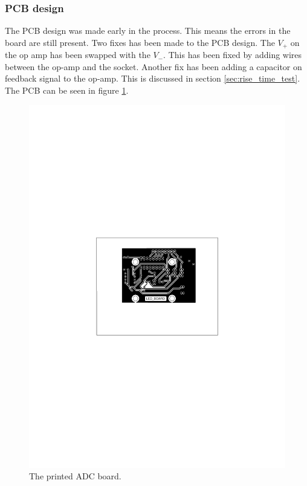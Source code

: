 \subsubsection{PCB design}
The PCB design was made early in the process.
This means the errors in the board are still present.
Two fixes has been made to the PCB design.
The $V_+$ on the op amp has been swapped with the $V_-$.
This has been fixed by adding wires between the op-amp and the socket.
Another fix has been adding a capacitor on feedback signal to the op-amp.
This is discussed in section \ref{sec:rise_time_test}. 
The PCB can be seen in figure \ref{fig:adc_board}.

\begin{figure}[ht]                     %
\centering
 \includegraphics[scale=1,trim={7.6cm 13.5cm 8cm 11.8cm},clip]{img/printed_adc_board}
 \caption{The printed ADC board.}\label{fig:adc_board}
\end{figure}
